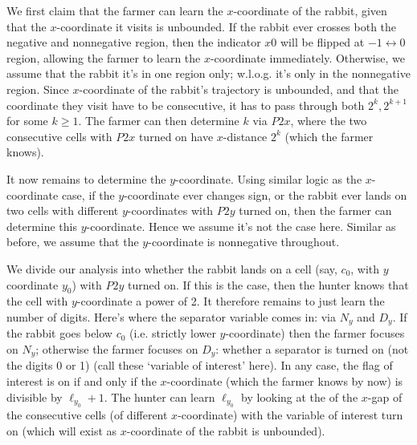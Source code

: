 \documentclass[11pt,a4paper]{article}
\begin{document}
\begin{enumerate}
        We first claim that the farmer can learn the $x$-coordinate of the rabbit, given that the $x$-coordinate it visits is unbounded. 
        If the rabbit ever crosses both the negative and nonnegative region, 
        then the indicator $x0$ will be flipped at $-1\leftrightarrow 0$ region, 
        allowing the farmer to learn the $x$-coordinate immediately. 
        Otherwise, we assume that the rabbit it's in one region only; w.l.o.g. it's only in the nonnegative region. 
        Since $x$-coordinate of the rabbit's trajectory is unbounded, 
        and that the coordinate they visit have to be consecutive, 
        it has to pass through both $2^k, 2^{k+1}$ for some $k\ge 1$. 
        The farmer can then determine $k$ via $P2x$, 
        where the two consecutive cells with $P2x$ turned on have $x$-distance $2^k$ (which the farmer knows). 
        
        It now remains to determine the $y$-coordinate. 
        Using similar logic as the $x$-coordinate case, 
        if the $y$-coordinate ever changes sign, or the rabbit ever lands on two cells with different $y$-coordinates with $P2y$ turned on, 
        then the farmer can determine this $y$-coordinate. 
        Hence we assume it's not the case here. 
        Similar as before, we assume that the $y$-coordinate is nonnegative throughout. 
        
        We divide our analysis into whether the rabbit lands on a cell (say, $c_0$, with $y$ coordinate $y_0$) with $P2y$ turned on. 
        If this is the case, then the hunter knows that the cell with $y$-coordinate a power of 2. 
        It therefore remains to just learn the number of digits. 
        Here's where the separator variable comes in: via $N_y$ and $D_y$. 
        If the rabbit goes below $c_0$ (i.e. strictly lower $y$-coordinate) then the farmer focuses on $N_y$; 
        otherwise the farmer focuses on $D_y$: whether a separator is turned on (not the digits 0 or 1)
        (call these `variable of interest' here). 
        In any case, the flag of interest is on if and only if the $x$-coordinate (which the farmer knows by now) is divisible by $\ell_{y_0}+1$. 
        The hunter can learn $\ell_{y_0}$ by looking at the of the $x$-gap of the consecutive cells (of different $x$-coordinate) with the variable of interest turn on 
        (which will exist as $x$-coordinate of the rabbit is unbounded). 
        

\end{enumerate}
\end{document}
